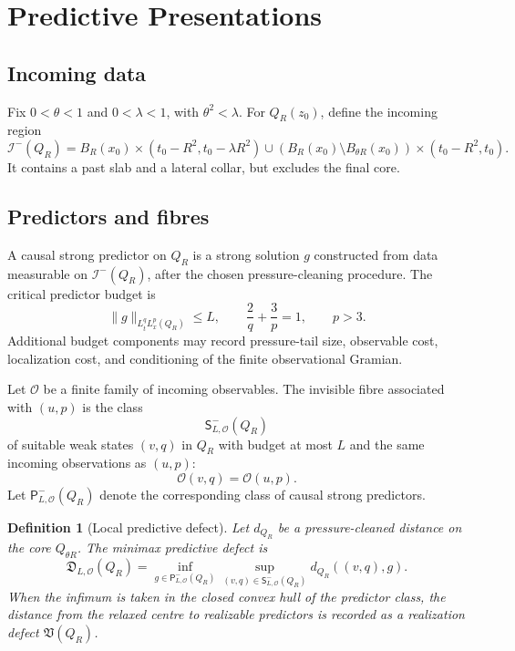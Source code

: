 \documentclass[11pt]{article}
\newtheorem{definition}[theorem]{Definition}
\begin{document}
\section{Predictive Presentations}

\subsection{Incoming data}

Fix \(0<\theta<1\) and \(0<\lambda<1\), with \(\theta^2<\lambda\). For \(Q_R(z_0)\), define the incoming region
\[
\mathcal I^-(Q_R)
=
B_R(x_0)\times(t_0-R^2,t_0-\lambda R^2)
\cup
(B_R(x_0)\setminus B_{\theta R}(x_0))\times(t_0-R^2,t_0).
\]
It contains a past slab and a lateral collar, but excludes the final core.

\subsection{Predictors and fibres}

A causal strong predictor on \(Q_R\) is a strong solution \(g\) constructed from data measurable on \(\mathcal I^-(Q_R)\), after the chosen pressure-cleaning procedure. The critical predictor budget is
\[
\|g\|_{L^q_tL^p_x(Q_R)}\le L,
\qquad
\frac2q+\frac3p=1,
\qquad
p>3.
\]
Additional budget components may record pressure-tail size, observable cost, localization cost, and conditioning of the finite observational Gramian.

Let \(\mathcal O\) be a finite family of incoming observables. The invisible fibre associated with \((u,p)\) is the class
\[
\mathsf S^-_{L,\mathcal O}(Q_R)
\]
of suitable weak states \((v,q)\) in \(Q_R\) with budget at most \(L\) and the same incoming observations as \((u,p)\):
\[
\mathcal O(v,q)=\mathcal O(u,p).
\]
Let \(\mathsf P^-_{L,\mathcal O}(Q_R)\) denote the corresponding class of causal strong predictors.

\begin{definition}[Local predictive defect]
Let \(d_{Q_R}\) be a pressure-cleaned distance on the core \(Q_{\theta R}\). The minimax predictive defect is
\[
\mathfrak D_{L,\mathcal O}(Q_R)
=
\inf_{g\in \mathsf P^-_{L,\mathcal O}(Q_R)}
\sup_{(v,q)\in \mathsf S^-_{L,\mathcal O}(Q_R)}
d_{Q_R}((v,q),g).
\]
When the infimum is taken in the closed convex hull of the predictor class, the distance from the relaxed centre to realizable predictors is recorded as a realization defect \(\mathfrak V(Q_R)\).
\end{definition}
\end{document}
